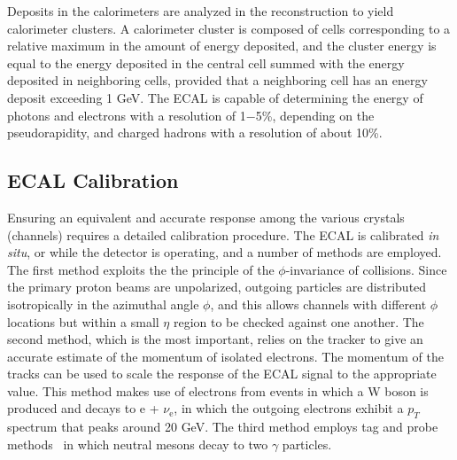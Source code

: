 Deposits in the calorimeters are analyzed in the reconstruction to yield calorimeter clusters. A calorimeter cluster is composed of cells corresponding to a relative maximum in the amount of energy deposited, and the cluster energy is equal to the energy deposited in the central cell summed with the energy deposited in neighboring cells, provided that a neighboring cell has an energy deposit exceeding 1 GeV. The ECAL is capable of determining the energy of photons and electrons with a resolution of 1$-$5\%, depending on the pseudorapidity, and charged hadrons with a resolution of about 10\%. 



\subsection{ECAL Calibration}
Ensuring an equivalent and accurate response among the various crystals (channels) requires a detailed calibration procedure. The ECAL is calibrated {\it in situ}, or while the detector is operating, and a number of methods are employed. The first method exploits the the principle of the $\phi$-invariance of collisions. Since the primary proton beams are unpolarized, outgoing particles are distributed isotropically in the azimuthal angle $\phi$, and this allows channels with different $\phi$ locations but within a small $\eta$ region to be checked against one another. The second method, which is the most important, relies on the tracker to give an accurate estimate of the momentum of isolated electrons. The momentum of the tracks can be used to scale the response of the ECAL signal to the appropriate value. This method makes use of electrons from events in which a W boson is produced and decays to e + $\nu_{\text{e}}$, in which the outgoing electrons exhibit a $p_T$ spectrum that peaks around 20 GeV. The third method employs tag and probe methods~\cite{Beaudette:2014cea} in which neutral mesons decay to two $\gamma$ particles. 

